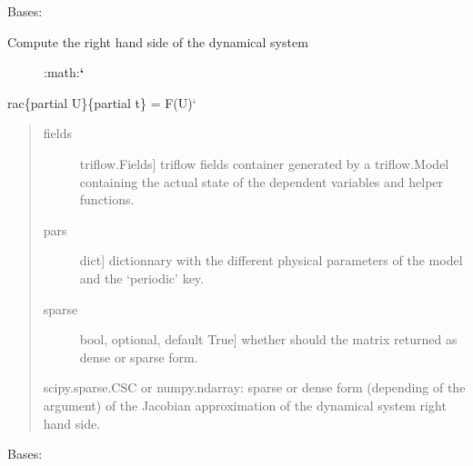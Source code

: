\documentclass[letterpaper,10pt,english]{sphinxmanual}
\begin{document}
\begin{fulllineitems}
\label{\detokenize{triflow.core:triflow.core.routines.J_Routine}}
Bases: {\hyperref[\detokenize{triflow.core:triflow.core.routines.ModelRoutine}]{}}
\begin{description}
\item[{Compute the right hand side of the dynamical system}] \leavevmode
:math:{\color{red}\bfseries{}{}`}

\end{description}

rac\{partial U\}\{partial t\} = F(U){}`
\begin{quote}
\begin{description}
\item[{fields}] \leavevmode{[}triflow.Fields{]}
triflow fields container generated by a triflow.Model containing the actual state of the dependent variables and helper functions.

\item[{pars}] \leavevmode{[}dict{]}
dictionnary with the different physical parameters of the model and the `periodic' key.

\item[{sparse}] \leavevmode{[}bool, optional, default True{]}
whether should the matrix returned as dense or sparse form.

\end{description}

scipy.sparse.CSC or numpy.ndarray: sparse or dense form (depending of the  argument) of the Jacobian approximation of the dynamical system right hand side.
\end{quote}

\end{fulllineitems}


\begin{fulllineitems}
\label{\detokenize{triflow.core:triflow.core.routines.ModelRoutine}}
Bases: 

\end{fulllineitems}
\end{document}
